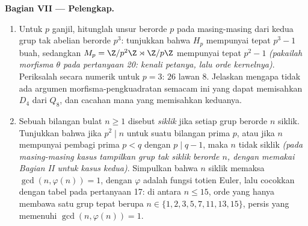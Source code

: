 \begin{problem}
\medskip
\noindent\textbf{Bagian VII --- Pelengkap.}
\begin{enumerate}[resume]
  \item Untuk $p$ ganjil, hitunglah unsur berorde $p$ pada masing-masing
        dari kedua grup tak abelian berorde $p^3$: tunjukkan bahwa
        $H_p$ mempunyai tepat $p^3 - 1$ buah, sedangkan $M_p =
        \Z/p^2\Z \rtimes \Z/p\Z$ mempunyai tepat $p^2 - 1$
        \emph{(pakailah morfisma $\theta$ pada pertanyaan 20:
        kenali petanya, lalu orde kernelnya)}.
        Periksalah secara numerik untuk $p = 3$: $26$ lawan $8$.
        Jelaskan mengapa tidak ada argumen morfisma-pengkuadratan semacam ini
        yang dapat memisahkan $D_4$ dari $Q_8$, dan cacahan mana yang
        memisahkan keduanya.
  \item Sebuah bilangan bulat $n \geq 1$ disebut \emph{siklik} jika setiap grup
        berorde $n$ siklik. Tunjukkan bahwa jika $p^2 \mid n$ untuk
        suatu bilangan prima $p$, atau jika $n$ mempunyai pembagi prima $p < q$
        dengan $p \mid q - 1$, maka $n$ tidak siklik \emph{(pada
        masing-masing kasus tampilkan grup tak siklik berorde $n$, dengan memakai
        Bagian II untuk kasus kedua)}. Simpulkan bahwa $n$ siklik memaksa
        $\gcd(n, \varphi(n)) = 1$, dengan $\varphi$ adalah fungsi
        totien Euler, lalu cocokkan dengan tabel pada pertanyaan 17:
        di antara $n \leq 15$, orde yang hanya membawa satu grup
        tepat berupa $n \in \{1, 2, 3, 5, 7, 11, 13, 15\}$,
        persis yang memenuhi $\gcd(n, \varphi(n)) = 1$.

\end{enumerate}
\end{problem}
